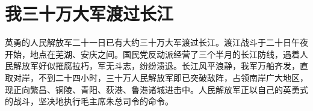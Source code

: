 \section[我三十万大军渡过长江（一九四九年四月二十二日）]{我三十万大军渡过长江}


英勇的人民解放军二十一日已有大约三十万大军渡过长江。渡江战斗于二十日午夜开始，地点在芜湖、安庆之间。国民党反动派经营了三个半月的长江防线，遇着人民解放军好似摧腐拉朽，军无斗志，纷纷溃退。长江风平浪静，我军万船齐发，直取对岸，不到二十四小时，三十万人民解放军即已突破敌阵，占领南岸广大地区，现正向繁昌、铜陵、青阳、荻港、鲁港诸城进击中。人民解放军正以自己的英勇式的战斗，坚决地执行毛主席朱总司令的命令。

